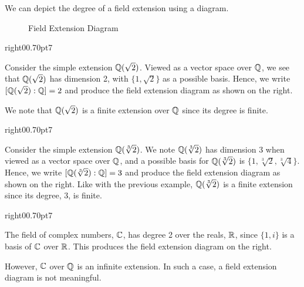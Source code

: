 We can depict the degree of a field extension using a diagram.
\begin{figure}[H]
    \centering
    \caption{Field Extension Diagram}
\end{figure}

\begin{examplewithcutout}{right}{0}{0.7\textwidth}{0pt}{7}{
    \begin{figure}[H]
        \centering
    \end{figure}
}
    Consider the simple extension $\mathbb{Q}(\sqrt2)$. Viewed as a vector space over $\mathbb{Q}$, we see that $\mathbb{Q}(\sqrt 2)$ has dimension 2, with $\{1, \sqrt2\}$ as a possible basis. Hence, we write $[\mathbb{Q}(\sqrt2):\mathbb{Q}] = 2$ and produce the field extension diagram as shown on the right.

    We note that $\mathbb{Q}(\sqrt2)$ is a finite extension over $\mathbb{Q}$ since its degree is finite.
\end{examplewithcutout}

\begin{examplewithcutout}{right}{0}{0.7\textwidth}{0pt}{7}{
    \begin{figure}[H]
        \centering
    \end{figure}
}
    Consider the simple extension $\mathbb{Q}(\sqrt[3]2)$. We note $\mathbb{Q}(\sqrt[3]2)$ has dimension 3 when viewed as a vector space over $\mathbb{Q}$, and a possible basis for $\mathbb{Q}(\sqrt[3]2)$ is $\{1, \sqrt[3]2, \sqrt[3]4\}$. Hence, we write $[\mathbb{Q}(\sqrt[3]2):\mathbb{Q}] = 3$ and produce the field extension diagram as shown on the right. Like with the previous example, $\mathbb{Q}(\sqrt[3]2)$ is a finite extension since its degree, 3, is finite.
\end{examplewithcutout}

\begin{examplewithcutout}{right}{0}{0.7\textwidth}{0pt}{7}{
    \begin{figure}[H]
        \centering
    \end{figure}
}
    The field of complex numbers, $\mathbb{C}$, has degree 2 over the reals, $\mathbb{R}$, since $\{1, i\}$ is a basis of $\mathbb{C}$ over $\mathbb{R}$. This produces the field extension diagram on the right.

    However, $\mathbb{C}$ over $\mathbb{Q}$ is an infinite extension. In such a case, a field extension diagram is not meaningful.
\end{examplewithcutout}


